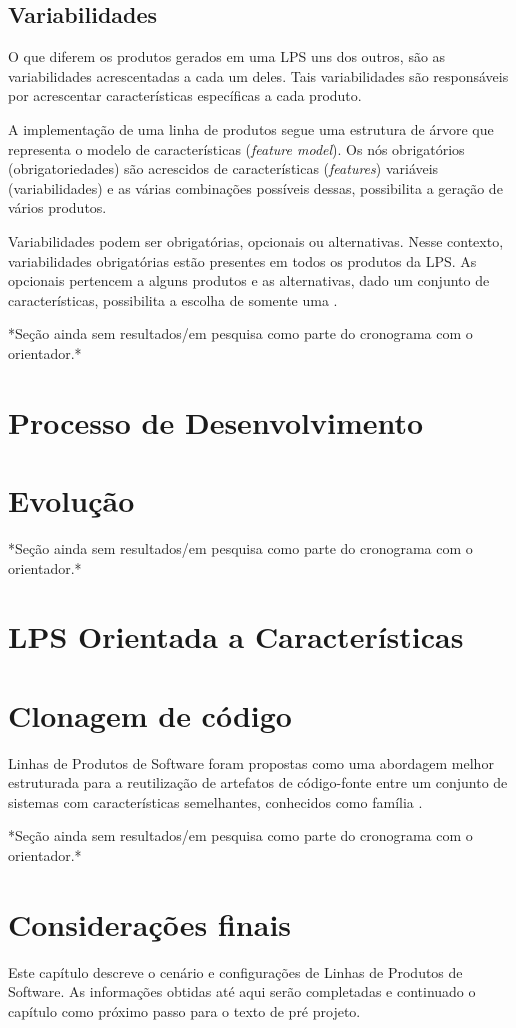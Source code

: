 \subsection{Variabilidades}

O que diferem os produtos gerados em uma LPS uns dos outros, são as variabilidades acrescentadas a cada um deles. Tais variabilidades são responsáveis por acrescentar características específicas a cada produto.

A implementação de uma linha de produtos segue uma estrutura de árvore que representa o modelo de características (\textit{feature model}). Os nós obrigatórios (obrigatoriedades) são acrescidos de características (\textit{features}) variáveis (variabilidades) e as várias combinações possíveis dessas, possibilita a geração de vários produtos.

Variabilidades podem ser obrigatórias, opcionais ou alternativas. Nesse contexto, variabilidades obrigatórias estão presentes em todos os produtos da LPS. As opcionais pertencem a alguns produtos e as alternativas, dado um conjunto de características, possibilita a escolha de somente uma \cite{colanzi2014abordagem}.

*Seção ainda sem resultados/em pesquisa como parte do cronograma com o orientador.*


\section{Processo de Desenvolvimento}



\section{Evolução}

*Seção ainda sem resultados/em pesquisa como parte do cronograma com o orientador.*


\section{LPS Orientada a Características}


\section{Clonagem de código}

Linhas de Produtos de Software foram propostas como uma abordagem melhor estruturada para a  reutilização de artefatos de código-fonte entre um conjunto de sistemas com características semelhantes, conhecidos como família .	

*Seção ainda sem resultados/em pesquisa como parte do cronograma com o orientador.*

\section{Considerações finais}

Este capítulo descreve o cenário e configurações de Linhas de Produtos de Software. As informações obtidas até aqui serão completadas e continuado o capítulo como próximo passo para o texto de pré projeto.